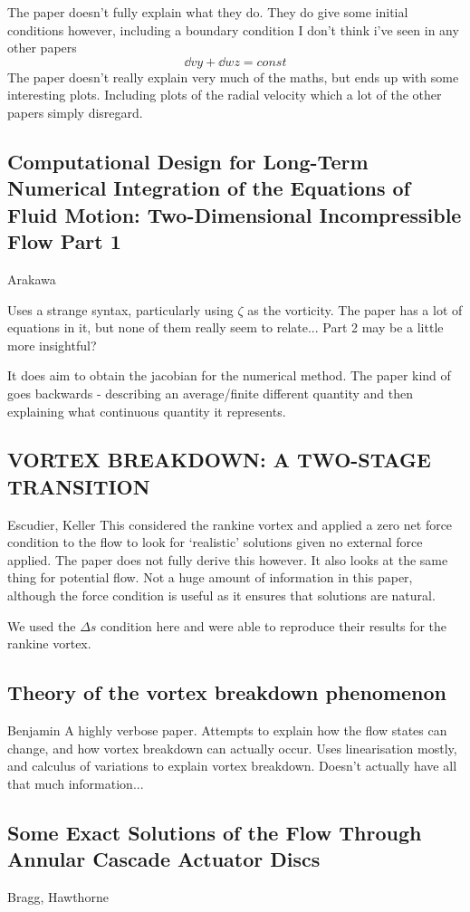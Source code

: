 \documentclass{X:/Documents/Coding/Latex/myreport}
\begin{document}
The paper doesn't fully explain what they do. They do give some initial conditions however, including a boundary condition I don't think i've seen in any other papers
\[\dd vy + \dd wz = const\]
The paper doesn't really explain very much of the maths, but ends up with some interesting plots.
Including plots of the radial velocity which a lot of the other papers simply disregard.
\subsection{Computational Design for Long-Term Numerical Integration of the Equations of Fluid Motion: Two-Dimensional Incompressible Flow Part 1}
Arakawa

Uses a strange syntax, particularly using $\zeta$ as the vorticity.
The paper has a lot of equations in it, but none of them really seem to relate... Part 2 may be a little more insightful?

It does aim to obtain the jacobian for the numerical method. The paper kind of goes backwards - describing an average/finite different quantity and then explaining what continuous quantity it represents.
\subsection{VORTEX BREAKDOWN: A TWO-STAGE TRANSITION}
Escudier, Keller
This considered the rankine vortex and applied a zero net force condition to the flow to look for `realistic' solutions given no external force applied. The paper does not fully derive this however. 
It also looks at the same thing for potential flow. Not a huge amount of information in this paper, although the force condition is useful as it ensures that solutions are natural.

We used the $\Delta s$ condition here and were able to reproduce their results for the rankine vortex.


\subsection{Theory of the vortex breakdown phenomenon}
Benjamin
A highly verbose paper. Attempts to explain how the flow states can change, and how vortex breakdown can actually occur. Uses linearisation mostly, and calculus of variations to explain vortex breakdown.
Doesn't actually have all that much information...


\subsection{Some Exact Solutions of the Flow Through Annular Cascade Actuator Discs}
Bragg, Hawthorne
\end{document}
